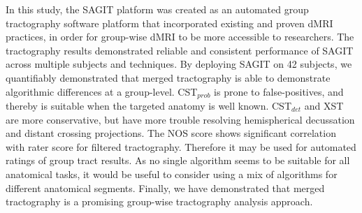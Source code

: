 In this study, the SAGIT platform was created as an automated group tractography software platform that incorporated existing and proven dMRI practices, in order for group-wise dMRI to be more accessible to researchers. The tractography results demonstrated reliable and consistent performance of SAGIT across multiple subjects and techniques. By deploying SAGIT on 42 subjects, we quantifiably demonstrated that merged tractography is able to demonstrate algorithmic differences at a group-level. CST$_{prob}$ is prone to false-positives, and thereby is suitable when the targeted anatomy is well known. CST$_{det}$ and XST are more conservative, but have more trouble resolving hemispherical decussation and distant crossing projections. The NOS score shows significant correlation with rater score for filtered tractography. Therefore it may be used for automated ratings of group tract results. As no single algorithm seems to be suitable for all anatomical tasks, it would be useful to consider using a mix of algorithms for different anatomical segments. Finally, we have demonstrated that merged tractography is a promising group-wise tractography analysis approach. 






